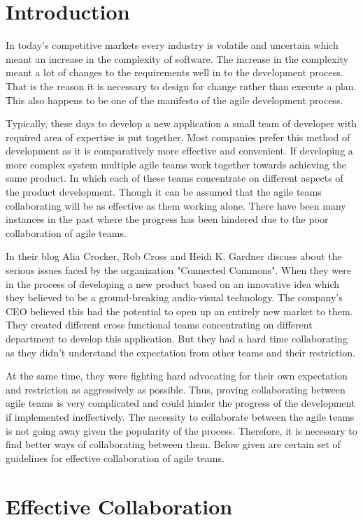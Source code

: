 \documentclass[sigconf]{acmart}
\begin{document}
\section{Introduction}
In today's competitive markets every industry is volatile and uncertain which meant an increase in the complexity of software. The increase in the complexity meant a lot of changes to the requirements well in to the development process. That is the reason it is necessary to design for change rather than execute a plan. This also happens to be one of the manifesto of the agile development process. 

Typically, these days to develop a new application a small team of developer with required area of expertise is put together. Most companies prefer this method of development as it is comparatively more effective and convenient. If developing a more complex system multiple agile teams work together towards achieving the same product. In which each of these teams concentrate on different aspects of the product development. Though it can be assumed that the agile teams collaborating will be as effective as them working alone. There have been many instances in the past where the progress has been hindered due to the poor collaboration of agile teams.

In their blog \cite{Alia01} Alia Crocker, Rob Cross and Heidi K. Gardner discuss about the serious issues faced by the organization "Connected Commons". When they were in the process of developing a new product based on an innovative idea which they believed to be a ground-breaking audio-visual technology. The company's CEO believed this had the potential to open up an entirely new market to them. They created different cross functional teams concentrating on different department to develop this application. But they had a hard time collaborating as they didn't understand the expectation from other teams and their restriction. 

At the same time, they were fighting hard advocating for their own expectation and restriction as aggressively as possible. Thus, proving collaborating between agile teams is very complicated and could hinder the progress of the development if implemented ineffectively. The necessity to collaborate between the agile teams is not going away given the popularity of the process. Therefore, it is necessary to find better ways of collaborating between them. Below given are certain set of guidelines for effective collaboration of agile teams.


\section{Effective Collaboration}
\end{document}
